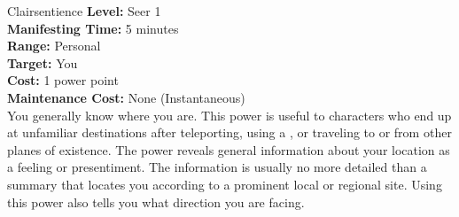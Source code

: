 {Clairsentience}
{
	\textbf{Level:}
	Seer 1\\
	\textbf{Manifesting Time:}
	5 minutes\\
	\textbf{Range:}
	Personal\\
	\textbf{Target:}
	You\\
	\textbf{Cost:}
	1 power point\\
	\textbf{Maintenance Cost:}
	None (Instantaneous)\\
}
{
	You generally know where you are. This power is useful to characters who end up at unfamiliar destinations after teleporting, using a , or traveling to or from other planes of existence. The power reveals general information about your location as a feeling or presentiment. The information is usually no more detailed than a summary that locates you according to a prominent local or regional site. Using this power also tells you what direction you are facing.
}